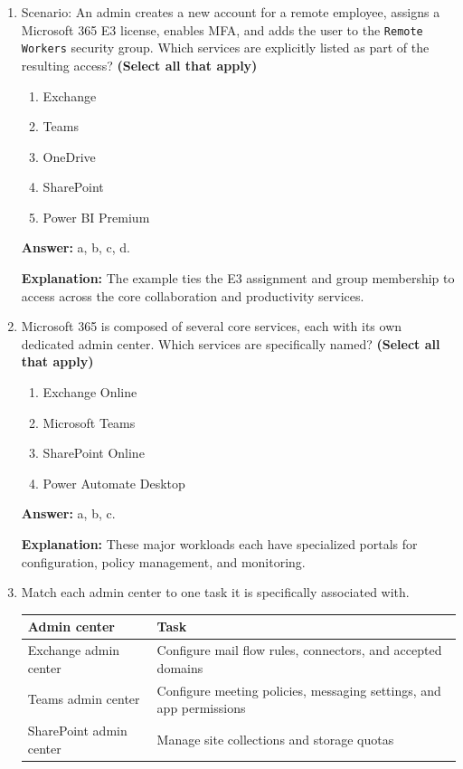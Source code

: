 \documentclass[10pt]{article}
\begin{document}
\begin{enumerate}[leftmargin=*]
\textbf{Explanation:} These group types help structure access, communication, and license or policy management across the tenant.

\item Scenario: An admin creates a new account for a remote employee, assigns a Microsoft 365 E3 license, enables MFA, and adds the user to the \texttt{Remote Workers} security group. Which services are explicitly listed as part of the resulting access? \textbf{(Select all that apply)}
\begin{enumerate}[label=\alph*., leftmargin=1.5em]
\item Exchange
\item Teams
\item OneDrive
\item SharePoint
\item Power BI Premium
\end{enumerate}
\textbf{Answer:} a, b, c, d.

\textbf{Explanation:} The example ties the E3 assignment and group membership to access across the core collaboration and productivity services.

\item Microsoft 365 is composed of several core services, each with its own dedicated admin center. Which services are specifically named? \textbf{(Select all that apply)}
\begin{enumerate}[label=\alph*., leftmargin=1.5em]
\item Exchange Online
\item Microsoft Teams
\item SharePoint Online
\item Power Automate Desktop
\end{enumerate}
\textbf{Answer:} a, b, c.

\textbf{Explanation:} These major workloads each have specialized portals for configuration, policy management, and monitoring.

\item Match each admin center to one task it is specifically associated with.

\begin{center}
\begin{tabular}{>{\raggedright\arraybackslash}p{} >{\raggedright\arraybackslash}p{}}
\toprule
\textbf{Admin center} & \textbf{Task} \\
\midrule
Exchange admin center & Configure mail flow rules, connectors, and accepted domains \\
Teams admin center & Configure meeting policies, messaging settings, and app permissions \\
SharePoint admin center & Manage site collections and storage quotas \\
\bottomrule
\end{tabular}
\end{center}


\end{enumerate}
\end{document}
